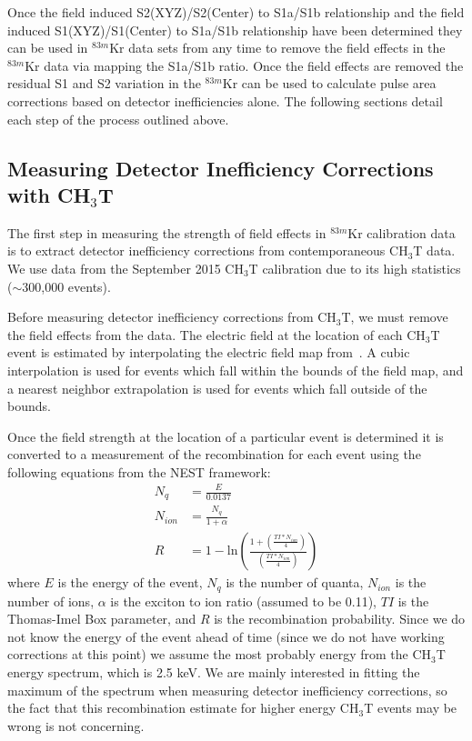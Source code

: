 \documentclass[a4paper,10pt,twocolumn]{article}
\begin{document}
Once the field induced S2(XYZ)/S2(Center) to S1a/S1b relationship and the field induced S1(XYZ)/S1(Center) to S1a/S1b relationship have been determined they can be used in $^{83m}$Kr data sets from any time to remove the field effects in the $^{83m}$Kr data via mapping the S1a/S1b ratio.  Once the field effects are removed the residual S1 and S2 variation in the $^{83m}$Kr can be used to calculate pulse area corrections based on detector inefficiencies alone. The following sections detail each step of the process outlined above.

\subsection{Measuring Detector Inefficiency Corrections with CH$_3$T}

The first step in measuring the strength of field effects in $^{83m}$Kr calibration data is to extract detector inefficiency corrections from contemporaneous CH$_3$T data.  We use data from the September 2015 CH$_3$T calibration due to its high statistics ($\sim$300,000 events). 

Before measuring detector inefficiency corrections from CH$_3$T, we must remove the field effects from the data.   The electric field at the location of each CH$_3$T event is estimated by interpolating the electric field map from~\cite{LuciesPaper}.  A cubic interpolation is used for events which fall within the bounds of the field map, and a nearest neighbor extrapolation is used for events which fall outside of the bounds.   

Once the field strength at the location of a particular event is determined it is converted to a measurement of the recombination for each event using the following equations from the NEST framework:
\begin{align}
N_q &= \frac{E}{0.0137} \label{NqEq} \\
N_{ion} &= \frac{N_q}{1+\alpha} \label{NionEq} \\
R &= 1-\mbox{ln} \left( \frac{1+(\frac{TI*N_{ion}}{4})}{(\frac{TI*N_{ion}}{4})} \right)
\end{align}
where $E$ is the energy of the event, $N_q$ is the number of quanta, $N_{ion}$ is the number of ions, $\alpha$ is the exciton to ion ratio (assumed to be 0.11), $TI$ is the Thomas-Imel Box parameter, and $R$ is the recombination probability.  Since we do not know the energy of the event ahead of time (since we do not have working corrections at this point) we assume the most probably energy from the CH$_3$T energy spectrum, which is 2.5 keV.  We are mainly interested in fitting the maximum of the spectrum when measuring detector inefficiency corrections, so the fact that this recombination estimate for higher energy CH$_3$T events may be wrong is not concerning.  
\end{document}
